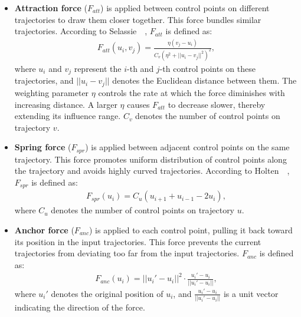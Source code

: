 \begin{itemize}
    \item \textbf{Attraction force} ($F_{att}$) is applied between control points on different trajectories to draw them closer together.
    This force bundles similar trajectories.
    According to Selassie~\etal~\cite{selassie2011divided}, $F_{att}$ is defined as:
    \begin{equation}
        \begin{aligned}
            F_{att}(u_i,v_j)=\frac{\eta(v_j-u_i)}{C_v(\eta^2+||u_i-v_j||^2)^2},
        \end{aligned}
    \end{equation}
    where $u_i$ and $v_j$ represent the $i$-th and $j$-th control points on these trajectories, and $||u_i - v_j||$ denotes the Euclidean distance between them.
    The weighting parameter $\eta$ controls the rate at which the force diminishes with increasing distance.
    A larger $\eta$ causes $F_{att}$ to decrease slower, thereby extending its influence range.
    $C_v$ denotes the number of control points on trajectory $v$.
    \item \textbf{Spring force} ($F_{spr}$) is applied between adjacent control points on the same trajectory.
    This force promotes uniform distribution of control points along the trajectory and avoids highly curved trajectories.
    According to Holten~\etal~\cite{holten2009force}, $F_{spr}$ is defined as:
    \begin{equation}
        \begin{aligned}
            F_{spr}(u_i) = C_u(u_{i+1}+u_{i-1}-2u_i),
        \end{aligned}
    \end{equation}
    where $C_u$ denotes the number of control points on trajectory $u$.
    \item \textbf{Anchor force} ($F_{anc}$) is applied to each control point, pulling it back toward its position in the input trajectories.
    This force prevents the current trajectories from deviating too far from the input trajectories. $F_{anc}$ is defined as:
    \begin{equation}
        \begin{aligned}
            F_{anc}(u_i)=||u_i'-u_i||^2\cdot \frac{u_i'-u_i}{||u_i'-u_i||},
        \end{aligned}
    \end{equation}
    where $u_i'$ denotes the original position of $u_i$, and $\frac{u_i'-u_i}{||u_i'-u_i||}$ is a unit vector indicating the direction of the force.
\end{itemize}



